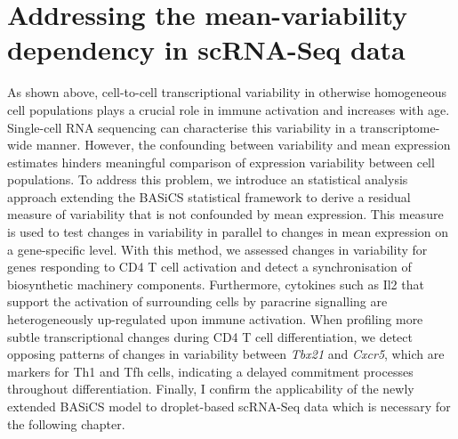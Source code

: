 
\chapter{Addressing the mean-variability dependency in scRNA-Seq data}  

\graphicspath{{"../../Dropbox (Cambridge  University)/Figures_for_thesis/Chapter2/"}}

\vfill

\begin{Abstract}
As shown above, cell-to-cell transcriptional variability in otherwise homogeneous cell populations plays a crucial role in immune activation and increases with age. Single-cell RNA sequencing can characterise this variability in a transcriptome-wide manner. However, the confounding between variability and mean expression estimates hinders meaningful comparison of expression variability between cell populations. To address this problem, we introduce an statistical analysis approach extending the BASiCS statistical framework to derive a residual measure of variability that is not confounded by mean expression. This measure is used to test changes in variability in parallel to changes in mean expression on a gene-specific level. With this method, we assessed changes in variability for genes responding to CD4\plus{} T cell activation and detect a synchronisation of biosynthetic machinery components. Furthermore, cytokines such as Il2 that support the activation of surrounding cells by paracrine signalling are heterogeneously up-regulated upon immune activation. When profiling more subtle transcriptional changes during CD4\plus{} T cell differentiation, we detect opposing patterns of changes in variability between \textit{Tbx21} and \textit{Cxcr5}, which are markers for Th1 and Tfh cells, indicating a delayed commitment processes throughout differentiation. Finally, I confirm the applicability of the newly extended BASiCS model to droplet-based scRNA-Seq data which is necessary for the following chapter.
\end{Abstract}

\vfill

\newpage

